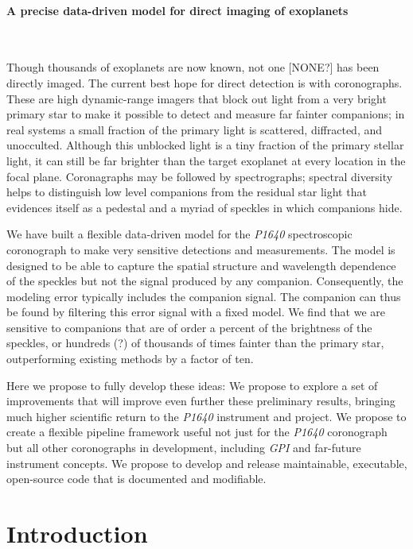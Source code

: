 \documentclass[12pt,pdftex,preprint]{aastex}
\newcommand{\project}[1]{\textsl{#1}}
\begin{document}
\paragraph{A precise data-driven model for direct imaging of exoplanets}~

Though thousands of exoplanets are now known, not one [NONE?] has been
directly imaged.  The current best hope for direct detection is with
coronographs.  These are high dynamic-range imagers that block out
light from a very bright primary star to make it possible to detect
and measure far fainter companions; in real systems a small fraction
of the primary light is scattered, diffracted, and unocculted.
Although this unblocked light is a tiny fraction of the primary
stellar light, it can still be far brighter than the target exoplanet
at every location in the focal plane.  Coronagraphs may be followed by
spectrographs; spectral diversity helps to distinguish low level
companions from the residual star light that evidences itself as a
pedestal and a myriad of speckles in which companions hide.

We have built a flexible data-driven model for
the \project{P1640} spectroscopic coronograph to make very sensitive
detections and measurements.  The model is designed to be able to
capture the spatial structure and wavelength dependence of the
speckles but not the signal produced by any companion. Consequently,
the modeling error typically includes the companion signal. The
companion can thus be found by filtering this error signal with a
fixed model.  We find that
we are sensitive to companions that are of order a percent of the
brightness of the speckles, or hundreds (?) of thousands of times
fainter than the primary star, outperforming
existing methods by a factor of ten.

Here we propose to fully develop these ideas: We propose to explore a
set of improvements that will improve even further these preliminary
results, bringing much higher scientific return to the \project{P1640}
instrument and project.  We propose to create a flexible pipeline
framework useful not just for the \project{P1640} coronograph but all
other coronographs in development, including \project{GPI} and
far-future instrument concepts.  We propose to develop and release
maintainable, executable, open-source code that is documented and
modifiable.

\clearpage
\section{Introduction}
\end{document}
